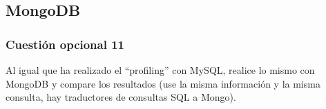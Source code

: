 \subsection{MongoDB}
\subsubsection{Cuestión opcional 11}
Al igual que ha realizado el “profiling” con MySQL,
realice lo mismo con MongoDB y compare los resultados (use la misma
información y la misma consulta, hay traductores de consultas SQL a
Mongo).

\newpage




